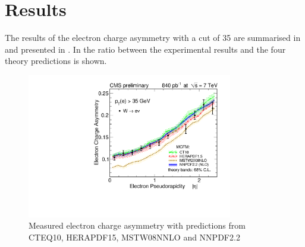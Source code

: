 \section{Results}
The results of the electron charge asymmetry with a \pT cut of \unit{35}{\GeV}
are summarised in  and presented in
.
In  the ratio between the experimental results and the four theory predictions is shown.


\begin{figure}[htbp]
  \begin{center}
\includegraphics*[width=0.80\textwidth]{updated_asym}
  \caption{\label{fig:updatedasym35} Measured electron charge asymmetry with predictions from CTEQ10, HERAPDF15, MSTW08NNLO and NNPDF2.2}
  \end{center}
\end{figure}

